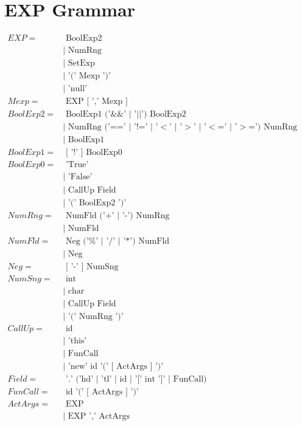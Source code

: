 \documentclass[10pt,a4paper]{article}
\begin{document}
\section{EXP Grammar}
\begin{math}
\begin{aligned}
EXP =& \text{ BoolExp2}
 \\&|\text{ NumRng} 
 \\&|\text{ SetExp }
 \\&|\text{ '(' Mexp ')'}
 \\&|\text{ 'null'}\\
Mexp =& \text{ EXP [ ',' Mexp ]}\\
BoolExp2 =& \text{ BoolExp1 ('\&\&' $|$ '$||$') BoolExp2}
 \\&|\text{ NumRng ('==' $|$ '!=' $|$ '$<$' $|$ '$>$' $|$ '$<$=' $|$ '$>$=') NumRng}
 \\&|\text{ BoolExp1}\\
BoolExp1 =& \text{ [ '!' ] BoolExp0}\\
BoolExp0 =& \text{ 'True'}
 \\&|\text{ 'False'}
 \\&|\text{ CallUp Field }
 \\&|\text{ '(' BoolExp2 ')'}\\
NumRng =& \text{ NumFld ('+' $|$ '-') NumRng}
 \\&|\text{ NumFld}\\
NumFld =& \text{ Neg ('\%' $|$ '/' $|$ '*') NumFld}
 \\&|\text{ Neg}\\
Neg =& \text{ [ '-' ] NumSng}\\
NumSng =& \text{ int}
 \\&|\text{ char }
 \\&|\text{ CallUp Field}
 \\&|\text{ '(' NumRng ')' }\\
CallUp =& \text{ id}
 \\&|\text{ 'this' }
 \\&|\text{ FunCall }
 \\&|\text{ 'new' id '(' [ ActArgs ] ')' } \\
Field =&\text{ '.' ('hd' $|$ 'tl' $|$ id $|$ '[' int ']' $|$ FunCall) }\\
FunCall =&\text{ id '(' [ ActArgs ] ')'} \\
ActArgs =&\text{ EXP }
 \\&|\text{ EXP ',' ActArgs }
\end{aligned}
\end{math}
\end{document}
